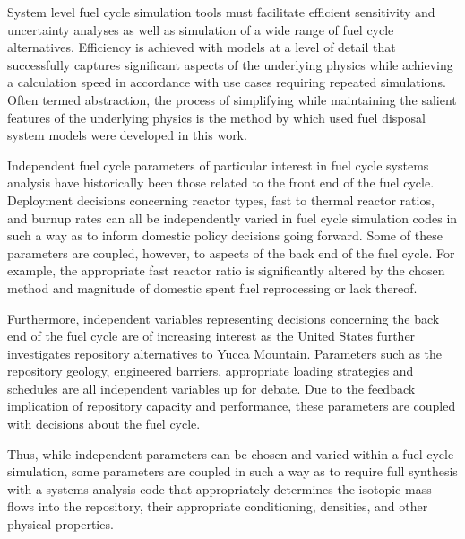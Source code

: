 
System level fuel cycle simulation tools must facilitate efficient sensitivity 
and uncertainty analyses as well as simulation of a wide range of fuel cycle 
alternatives.  Efficiency is achieved with models at a level of detail that 
successfully captures significant aspects of the underlying physics while 
achieving a calculation speed in accordance with use cases requiring repeated 
simulations.
Often termed abstraction, the process of simplifying while 
maintaining the salient features of the underlying physics is the method by 
which used fuel disposal system models were developed in this work. 


Independent fuel cycle parameters of particular interest in fuel cycle systems 
analysis have historically been those related to the front end of the fuel cycle. Deployment 
decisions concerning reactor types, fast to thermal reactor ratios, and burnup 
rates can all be independently varied in fuel cycle simulation codes in such a 
way as to inform domestic policy decisions going forward. Some of these 
parameters are coupled, however, to aspects of the back end of the fuel cycle.  
For example, the appropriate fast reactor ratio is significantly altered by the 
chosen method and magnitude of domestic spent fuel reprocessing or lack 
thereof.


Furthermore, independent variables representing decisions concerning the back end
of the fuel cycle are of increasing interest as the United States further
investigates repository alternatives to Yucca Mountain.  Parameters such as the
repository geology, engineered barriers, appropriate loading strategies and
schedules are all independent variables up for debate. Due to the feedback 
implication of repository capacity and performance, these
parameters are coupled with decisions about the fuel cycle. 


Thus, while independent parameters can be chosen and varied
within a fuel cycle simulation, some parameters are coupled in such a way as to
require full synthesis with a systems analysis code that appropriately
determines the isotopic mass flows into the repository, their appropriate
conditioning, densities, and other physical properties.  

